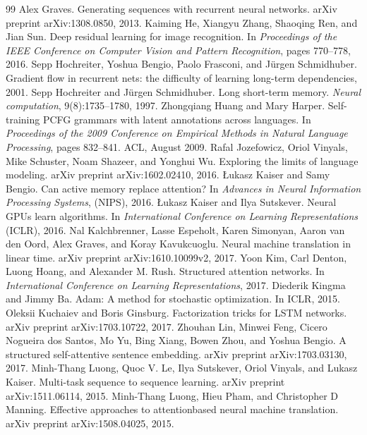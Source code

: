 \documentclass[12pt, a4paper]{article}
\begin{document}
\begin{thebibliography}{99}
 Alex Graves. Generating sequences with recurrent neural networks. arXiv preprint arXiv:1308.0850, 2013.
 Kaiming He, Xiangyu Zhang, Shaoqing Ren, and Jian Sun. Deep residual learning for image recognition. In \emph{Proceedings of the IEEE Conference on Computer Vision and Pattern Recognition}, pages 770--778, 2016.
 Sepp Hochreiter, Yoshua Bengio, Paolo Frasconi, and J\"{u}rgen Schmidhuber. Gradient flow in recurrent nets: the difficulty of learning long-term dependencies, 2001.
 Sepp Hochreiter and J\"{u}rgen Schmidhuber. Long short-term memory. \emph{Neural computation}, 9(8):1735--1780, 1997.
 Zhongqiang Huang and Mary Harper. Self-training PCFG grammars with latent annotations across languages. In \emph{Proceedings of the 2009 Conference on Empirical Methods in Natural Language Processing}, pages 832--841. ACL, August 2009.
 Rafal Jozefowicz, Oriol Vinyals, Mike Schuster, Noam Shazeer, and Yonghui Wu. Exploring the limits of language modeling. arXiv preprint arXiv:1602.02410, 2016.
 \L{}ukasz Kaiser and Samy Bengio. Can active memory replace attention? In \emph{Advances in Neural Information Processing Systems}, (NIPS), 2016.
 \L{}ukasz Kaiser and Ilya Sutskever. Neural GPUs learn algorithms. In \emph{International Conference on Learning Representations} (ICLR), 2016.
 Nal Kalchbrenner, Lasse Espeholt, Karen Simonyan, Aaron van den Oord, Alex Graves, and Koray Kavukcuoglu. Neural machine translation in linear time. arXiv preprint arXiv:1610.10099v2, 2017.
 Yoon Kim, Carl Denton, Luong Hoang, and Alexander M. Rush. Structured attention networks. In \emph{International Conference on Learning Representations}, 2017.
 Diederik Kingma and Jimmy Ba. Adam: A method for stochastic optimization. In ICLR, 2015.
 Oleksii Kuchaiev and Boris Ginsburg. Factorization tricks for LSTM networks. arXiv preprint arXiv:1703.10722, 2017.
 Zhouhan Lin, Minwei Feng, Cicero Nogueira dos Santos, Mo Yu, Bing Xiang, Bowen Zhou, and Yoshua Bengio. A structured self-attentive sentence embedding. arXiv preprint arXiv:1703.03130, 2017.
 Minh-Thang Luong, Quoc V. Le, Ilya Sutskever, Oriol Vinyals, and Lukasz Kaiser. Multi-task sequence to sequence learning. arXiv preprint arXiv:1511.06114, 2015.
 Minh-Thang Luong, Hieu Pham, and Christopher D Manning. Effective approaches to attentionbased neural machine translation. arXiv preprint arXiv:1508.04025, 2015.

\end{thebibliography}
\end{document}
